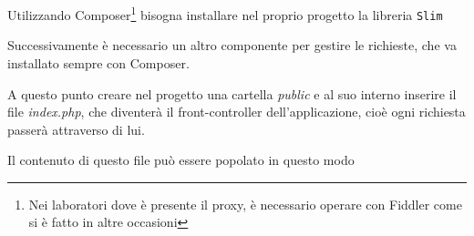 Utilizzando Composer\footnote{Nei laboratori dove è presente il proxy, è
  necessario operare con Fiddler come si è fatto in altre occasioni}
bisogna installare nel proprio progetto la libreria \texttt{Slim}

\begin{Shaded}
\begin{Highlighting}[]
\end{Highlighting}
\end{Shaded}

Successivamente è necessario un altro componente per gestire le
richieste, che va installato sempre con Composer.

\begin{Shaded}
\begin{Highlighting}[]
\end{Highlighting}
\end{Shaded}

A questo punto creare nel progetto una cartella \emph{public} e al suo
interno inserire il file \emph{index.php}, che diventerà il
front-controller dell'applicazione, cioè ogni richiesta passerà
attraverso di lui.

Il contenuto di questo file può essere popolato in questo modo

